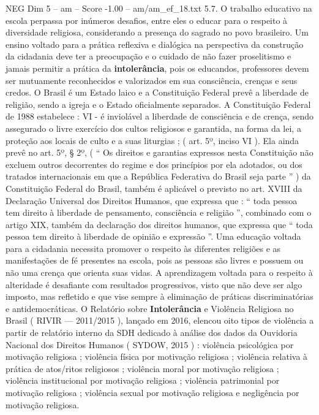 \begin{textsample}{NEG Dim 5 – am – Score -1.00 – am/am\_ef\_18.txt}  \label{ex:f5_neg_229}
5.7.
O trabalho educativo na escola perpassa por inúmeros desafios, entre eles o educar para o respeito à diversidade religiosa, considerando a presença do sagrado no povo brasileiro.
Um ensino voltado para a prática reflexiva e dialógica na perspectiva da construção da cidadania deve ter a preocupação e o cuidado de não fazer proselitismo e jamais permitir a prática da \textbf{intolerância}, pois os educandos, professores devem ser mutuamente reconhecidos e valorizados em sua consciência, crenças e seus credos.
O Brasil é um Estado laico e a Constituição Federal prevê a liberdade de religião, sendo a igreja e o Estado oficialmente separados.
A Constituição Federal de 1988 estabelece : VI - é inviolável a liberdade de consciência e de crença, sendo assegurado o livre exercício dos cultos religiosos e garantida, na forma da lei, a proteção aos locais de culto e a suas liturgias ; ( art. 5º, inciso VI ).
Ela ainda prevê no art. 5º, § 2º, ( “ Os direitos e garantias expressos nesta Constituição não excluem outros decorrentes do regime e dos princípios por ela adotados, ou dos tratados internacionais em que a República Federativa do Brasil seja parte ” ) da Constituição Federal do Brasil, também é aplicável o previsto no art.
XVIII da Declaração Universal dos Direitos Humanos, que expressa que : “ toda pessoa tem direito à liberdade de pensamento, consciência e religião ”, combinado com o artigo XIX, também da declaração dos direitos humanos, que expressa que “ toda pessoa tem direito à liberdade de opinião e expressão ”.
Uma educação voltada para a cidadania necessita promover o respeito às diferentes religiões e as manifestações de fé presentes na escola, pois as pessoas são livres e possuem ou não uma crença que orienta suas vidas.
A aprendizagem voltada para o respeito à alteridade é desafiante com resultados progressivos, visto que não deve ser algo imposto, mas refletido e que vise sempre à eliminação de práticas discriminatórias e antidemocráticas.
O Relatório sobre \textbf{Intolerância} e Violência Religiosa no Brasil ( RIVIR — 2011/2015 ), lançado em 2016, elencou oito tipos de violência a partir de relatório interno da SDH dedicado à análise dos dados da Ouvidoria Nacional dos Direitos Humanos ( SYDOW, 2015 ) : violência psicológica por motivação religiosa ; violência física por motivação religiosa ; violência relativa à prática de atos/ritos religiosos ; violência moral por motivação religiosa ; violência institucional por motivação religiosa ; violência patrimonial por motivação religiosa ; violência sexual por motivação religiosa e negligência por motivação religiosa.

\end{textsample}
